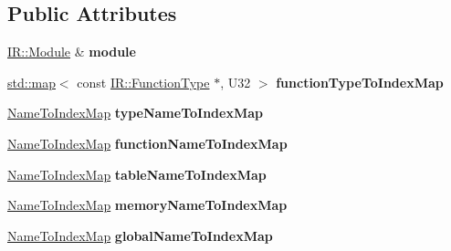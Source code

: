 \subsection*{Public Attributes}
\begin{DoxyCompactItemize}
\item 
\mbox{\label{struct_w_a_s_t_1_1_module_parse_state_a7c4c471c69d471eb81695cc9a74d9312}} 
\mbox{\hyperlink{struct_i_r_1_1_module}{I\+R\+::\+Module}} \& {\bfseries module}
\item 
\mbox{\label{struct_w_a_s_t_1_1_module_parse_state_af237a7ca492c2a219c585cd968fe60d3}} 
\mbox{\hyperlink{classstd_1_1map}{std\+::map}}$<$ const \mbox{\hyperlink{struct_i_r_1_1_function_type}{I\+R\+::\+Function\+Type}} $\ast$, U32 $>$ {\bfseries function\+Type\+To\+Index\+Map}
\item 
\mbox{\label{struct_w_a_s_t_1_1_module_parse_state_a699292c5ec8bc493c8b0ffbd6ed9ebce}} 
\mbox{\hyperlink{classstd_1_1unordered__map}{Name\+To\+Index\+Map}} {\bfseries type\+Name\+To\+Index\+Map}
\item 
\mbox{\label{struct_w_a_s_t_1_1_module_parse_state_a897a596297f121bfe1af3158e8c2edc5}} 
\mbox{\hyperlink{classstd_1_1unordered__map}{Name\+To\+Index\+Map}} {\bfseries function\+Name\+To\+Index\+Map}
\item 
\mbox{\label{struct_w_a_s_t_1_1_module_parse_state_a87372ef450c8d65189a25a0c1067896c}} 
\mbox{\hyperlink{classstd_1_1unordered__map}{Name\+To\+Index\+Map}} {\bfseries table\+Name\+To\+Index\+Map}
\item 
\mbox{\label{struct_w_a_s_t_1_1_module_parse_state_ad3169322a0142f0482a9762d6bbd6eae}} 
\mbox{\hyperlink{classstd_1_1unordered__map}{Name\+To\+Index\+Map}} {\bfseries memory\+Name\+To\+Index\+Map}
\item 
\mbox{\label{struct_w_a_s_t_1_1_module_parse_state_a655a616e07a5d961a15c0d76728679bb}} 
\mbox{\hyperlink{classstd_1_1unordered__map}{Name\+To\+Index\+Map}} {\bfseries global\+Name\+To\+Index\+Map}

\end{DoxyCompactItemize}
